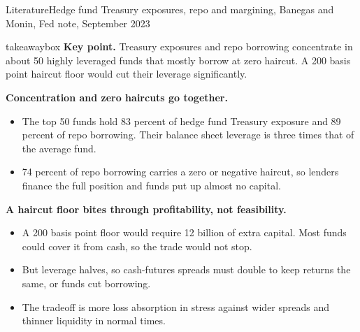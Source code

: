 \documentclass[aspectratio=169,11pt]{beamer}
\newcommand{\keypoint}[1]{%
  \begin{beamercolorbox}[sep=0.6em,wd=\textwidth]{takeawaybox}
    \textbf{Key point.} #1
  \end{beamercolorbox}}
\begin{document}
\begin{frame}{Literature}{Hedge fund Treasury exposures, repo and margining, Banegas and Monin, Fed note, September 2023}
  \footnotesize
  \keypoint{Treasury exposures and repo borrowing concentrate in about 50 highly leveraged funds that mostly borrow at zero haircut. A 200 basis point haircut floor would cut their leverage significantly.}
  \medskip
  \textbf{Concentration and zero haircuts go together.}
  \begin{itemize}
    \item The top 50 funds hold 83 percent of hedge fund Treasury exposure and 89 percent of repo borrowing. Their balance sheet leverage is three times that of the average fund.
    \item 74 percent of repo borrowing carries a zero or negative haircut, so lenders finance the full position and funds put up almost no capital. 
  \end{itemize}
  \smallskip
  \textbf{A haircut floor bites through profitability, not feasibility.}
  \begin{itemize}
    \item A 200 basis point floor would require 12 billion of extra capital. Most funds could cover it from cash, so the trade would not stop.
    \item But leverage halves, so cash-futures spreads must double to keep returns the same, or funds cut borrowing.
    \item The tradeoff is more loss absorption in stress against wider spreads and thinner liquidity in normal times.
  \end{itemize}
\end{frame}
\end{document}
